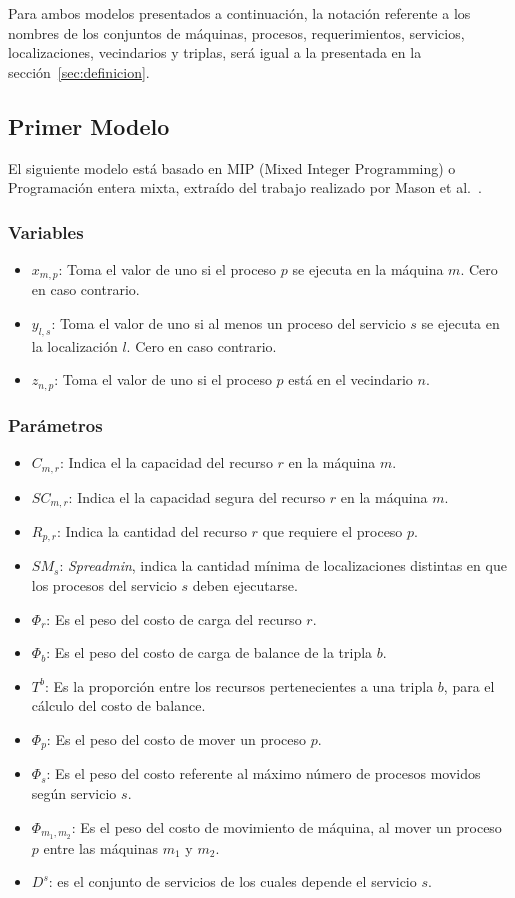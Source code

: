 \documentclass[../informe2.tex]{subfiles}
\begin{document}
Para ambos modelos presentados a continuación, la notación referente a los nombres de los conjuntos de máquinas, procesos, requerimientos, servicios, localizaciones, vecindarios y triplas, será igual a la presentada en la sección~\ref{sec:definicion}.
\subsection{Primer Modelo}
El siguiente modelo está basado en  MIP (Mixed Integer Programming) o Programación entera mixta, extraído del trabajo realizado por Mason et al.~\cite{masson2013iterated}.

\subsubsection{Variables}
\begin{itemize}
	\item $x_{m,p}$: Toma el valor de uno si el proceso $p$ se ejecuta en la máquina $m$. Cero en caso contrario.
	\item $y_{l,s}$: Toma el valor de uno si al menos un proceso del servicio $s$ se ejecuta en la localización $l$. Cero en caso contrario.
	\item $z_{n,p}$: Toma el valor de uno si el proceso $p$ está en el vecindario $n$.
\end{itemize}

\subsubsection{Parámetros}
\begin{itemize}
	\item $C_{m,r}$: Indica el la capacidad del recurso $r$ en la máquina $m$.
	\item $SC_{m,r}$: Indica el la capacidad segura del recurso $r$ en la máquina $m$.
	\item $R_{p,r}$: Indica la cantidad del recurso $r$ que requiere el proceso $p$.
	\item $SM_{s}$: \textit{Spreadmin}, indica la cantidad mínima de localizaciones distintas en que los procesos del servicio $s$ deben ejecutarse.
	\item $\Phi_{r}$: Es el peso del costo de carga del recurso $r$.
	\item $\Phi_{b}$: Es el peso del costo de carga de balance de la tripla $b$.
	\item $T^b$: Es la proporción entre los recursos pertenecientes a una tripla $b$, para el cálculo del costo de balance.
	\item $\Phi_{p}$: Es el peso del costo de mover un proceso $p$.
	\item $\Phi_{s}$: Es el peso del costo referente al máximo número de procesos movidos según servicio $s$.
	\item $\Phi_{m_1,m_2}$: Es el peso del costo de movimiento de máquina, al mover un proceso $p$ entre las máquinas $m_1$ y $m_2$.
	\item $D^s$: es el conjunto de servicios de los cuales depende el servicio $s$.
\end{itemize}
\end{document}
